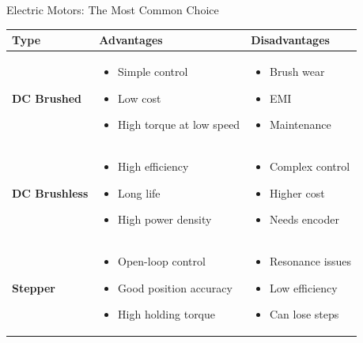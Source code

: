 \documentclass[10pt]{beamer}
\begin{document}
\begin{frame}{Electric Motors: The Most Common Choice}
\small               %
\setlength{\tabcolsep}{4pt} %
\renewcommand{\arraystretch}{0.9} %

\begin{table}
\centering
\begin{tabular}{p{} p{} p{}}
\toprule
\textbf{Type} & \textbf{Advantages} & \textbf{Disadvantages} \\
\midrule

\textbf{DC Brushed} &
\begin{itemize}\footnotesize
    \item Simple control
    \item Low cost
    \item High torque at low speed
\end{itemize} &
\begin{itemize}\footnotesize
    \item Brush wear
    \item EMI
    \item Maintenance
\end{itemize} \\

\textbf{DC Brushless} &
\begin{itemize}\footnotesize
    \item High efficiency
    \item Long life
    \item High power density
\end{itemize} &
\begin{itemize}\footnotesize
    \item Complex control
    \item Higher cost
    \item Needs encoder
\end{itemize} \\

\textbf{Stepper} &
\begin{itemize}\footnotesize
    \item Open-loop control
    \item Good position accuracy
    \item High holding torque
\end{itemize} &
\begin{itemize}\footnotesize
    \item Resonance issues
    \item Low efficiency
    \item Can lose steps
\end{itemize} \\
\bottomrule
\end{tabular}
\end{table}


\end{frame}
\end{document}
